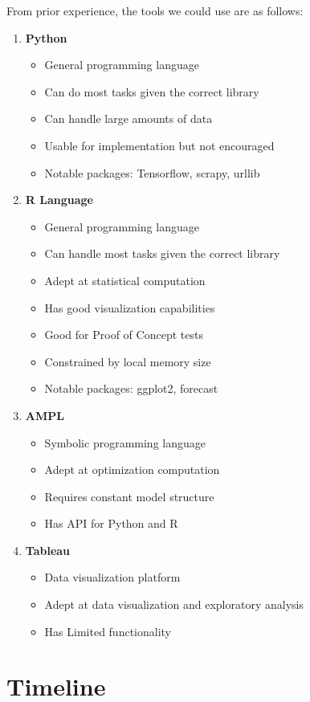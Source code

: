 \documentclass[a4paper, fleqn]{article}
\begin{document}
From prior experience, the tools we could use are as follows:
\begin{enumerate}
\item \textbf{Python} \begin{itemize}
\item General programming language
\item Can do most tasks given the correct library
\item Can handle large amounts of data
\item Usable for implementation but not encouraged
\item Notable packages: Tensorflow, scrapy, urllib
\end{itemize}
\item \textbf{R Language}  \begin{itemize}
\item General programming language
\item Can handle most tasks given the correct library
\item Adept at statistical computation
\item Has good visualization capabilities
\item Good for Proof of Concept tests
\item Constrained by local memory size
\item Notable packages: ggplot2, forecast
\end{itemize}
\item \textbf{AMPL}  \begin{itemize}
\item Symbolic programming language
\item Adept at optimization computation
\item Requires constant model structure
\item Has API for Python and R
\end{itemize}
\item \textbf{Tableau} \begin{itemize}
\item Data visualization platform
\item Adept at data visualization and exploratory analysis
\item Has Limited functionality
\end{itemize}
\end{enumerate}

\pagebreak

\section{Timeline}
\end{document}

